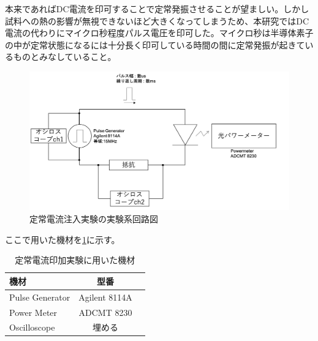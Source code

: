 本来であればDC電流を印可することで定常発振させることが望ましい。しかし試料への熱の影響が無視できないほど大きくなってしまうため、本研究ではDC電流の代わりにマイクロ秒程度パルス電圧を印可した。マイクロ秒は半導体素子の中が定常状態になるには十分長く印可している時間の間に定常発振が起きているものとみなしていること。

\begin{figure}[htbp]
	\includegraphics[width=15cm]{figure/fig_2_2_IL_setup.png}
	\caption{定常電流注入実験の実験系回路図}
	\label{fig:fig_2_2_IL_setup}
\end{figure}
\clearpage
ここで用いた機材を\ref{table:table_2_2_IL_setup}に示す。
\begin{table}[hbtp]
  \caption{定常電流印加実験に用いた機材}
    \label{table:table_2_2_IL_setup}
  \centering
  \begin{tabular}{lcr}
    \hline
    機材  & 型番     \\
    \hline \hline
    Pulse Generator  & Agilent 8114A   \\
    Power Meter  &  ADCMT 8230    \\
    Oscilloscope  &  埋める  \\
       \hline
  \end{tabular}
\end{table}
 \clearpage

